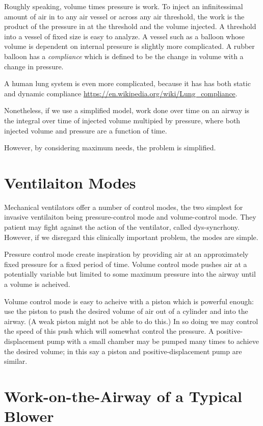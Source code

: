 \documentclass{article}
\begin{document}
Roughly speaking, volume times pressure is work.
To inject an infinitessimal amount of air in
to any air vessel or across any air threshold,
the work is the product of the pressure in at the threshold and the
volume injected.
A threshold into a vessel of fixed size is easy to analyze.
A vessel such as a balloon whose volume is dependent on internal pressure
is slightly more complicated.
A rubber balloon has a {\em compliance} which is defined to be
the change in volume with a change in pressure.

A human lung system is even more
complicated, because it has has
both static and dynamic compliance \url{https://en.wikipedia.org/wiki/Lung_compliance}.

Nonetheless, if we use a simplified model, work done over time
on an airway is the integral over time of injected volume
multipied by pressure, where both injected volume and
pressure are a function of time.

However, by considering maximum needs, the problem is simplified.

\section{Ventilaiton Modes}

Mechanical ventilators offer a number of control modes, the two
simplest for invasive ventilaiton
being pressure-control mode and volume-control mode.
They patient may fight against the action of the ventilator,
called dys-syncrhony. However, if we disregard this clinically
important problem, the modes are simple.

Pressure control mode create inspiration by providing air
at an approximately fixed pressure for a fixed period of time.
Volume control mode pushes air at a potentially variable but
limited to some maximum pressure into the airway until a volume
is acheived.

Volume control mode is easy to acheive with a piston which is
powerful enough: use the piston to push the desired volume of
air out of a cylinder and into the airway. (A weak piston might
not be able to do this.) In so doing we may control the speed
of this push which will somewhat control the pressure.
A positive-displacement pump with a small chamber may be pumped
many times to achieve the desired volume; in this say a
piston and positive-displacement pump are similar.

\section{Work-on-the-Airway of a Typical Blower}
\end{document}

